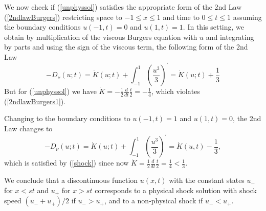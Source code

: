 
We now check if (\ref{unphyssol}) satisfies the appropriate 
form of the 2nd Law (\ref{2ndlawBurgers})  
restricting space to $-1\le x\le 1$ and time to $0\le t\le 1$ assuming
the boundary conditions $u(-1,t)=0$ and $u(1,t)=1$. In this setting,
we obtain by multiplication of the viscous Burgers equation with $u$
and integrating by parts and using the sign of the viscous
term, the following form of the 2nd Law
\begin{equation}\label{2ndlawBurgers1}
-D_\nu (u;t)=  \dot K(u;t)+\int_{-1}^1(\frac{u^3}{3})^\prime =\dot K(u;t)+\frac{1}{3}
\end{equation} 
But for (\ref{unphyssol}) we have 
$\dot K=-\frac{1}{2}\frac{d}{dt}\frac{t}{2}=-\frac{1}{4}$, which
violates (\ref{2ndlawBurgers1}). 

Changing to the boundary conditions to $u(-1,t)=1$ and $u(1,t)=0$,
the 2nd Law changes to 
\begin{equation}\label{2ndlawBurgers2}
-D_\nu (u;t)= \dot K(u;t)+\int_{-1}^1(\frac{u^3}{3})^\prime =\dot K(u,t)-\frac{1}{3},
\end{equation} 
which is satisfied by (\ref{shock}) since now
$\dot K=\frac{1}{2}\frac{d}{dt}\frac{t}{2}=\frac{1}{4}<\frac{1}{3}$.

We conclude that a  discontinuous function $u(x,t)$ with the constant
states $u_-$ for $x<st$ and $u_+$ for $x>st$ corresponds
to a physical shock solution with shock speed $(u_-+u_+)/2$
if $u_-> u_+$, and to a non-physical 
shock if $u_-<u_+$.

